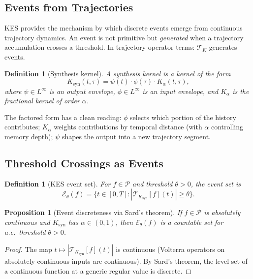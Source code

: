 \documentclass[12pt]{article}
\newtheorem{proposition}[theorem]{Proposition}
\newtheorem{definition}[theorem]{Definition}
\newcommand{\Pcal}{\mathcal{P}}
\newcommand{\TK}{\mathcal{T}_K}
\begin{document}
\subsection{Events from Trajectories}

KES provides the mechanism by which discrete events emerge from continuous
trajectory dynamics. An event is not primitive but \emph{generated} when a
trajectory accumulation crosses a threshold. In trajectory-operator terms:
$\TK$ generates events.

\begin{definition}[Synthesis kernel]
A \emph{synthesis kernel} is a kernel of the form
\[
  K_{\mathrm{syn}}(t,\tau) = \psi(t)\cdot\phi(\tau)\cdot K_\alpha(t,\tau),
\]
where $\psi \in L^\infty$ is an output envelope, $\phi \in L^\infty$ is
an input envelope, and $K_\alpha$ is the fractional kernel of order
$\alpha$.
\end{definition}

The factored form has a clean reading: $\phi$ selects which portion of the
history contributes; $K_\alpha$ weights contributions by temporal distance
(with $\alpha$ controlling memory depth); $\psi$ shapes the output into a
new trajectory segment.

\subsection{Threshold Crossings as Events}

\begin{definition}[KES event set]
For $f \in \Pcal$ and threshold $\theta > 0$, the \emph{event set} is
\[
  \mathcal{E}_\theta(f) = \bigl\{t \in [0,T] :
  |\mathcal{T}_{K_{\mathrm{syn}}}[f](t)| \geq \theta\bigr\}.
\]
\end{definition}

\begin{proposition}[Event discreteness via Sard's theorem]
\label{prop:discrete}
If $f \in \Pcal$ is absolutely continuous and $K_{\mathrm{syn}}$ has
$\alpha \in (0,1)$, then $\mathcal{E}_\theta(f)$ is a countable set for
a.e.\ threshold $\theta > 0$.
\end{proposition}

\begin{proof}
The map $t \mapsto |\mathcal{T}_{K_{\mathrm{syn}}}[f](t)|$ is continuous
(Volterra operators on absolutely continuous inputs are continuous). By
Sard's theorem, the level set of a continuous function at a generic regular
value is discrete.
\end{proof}
\end{document}
